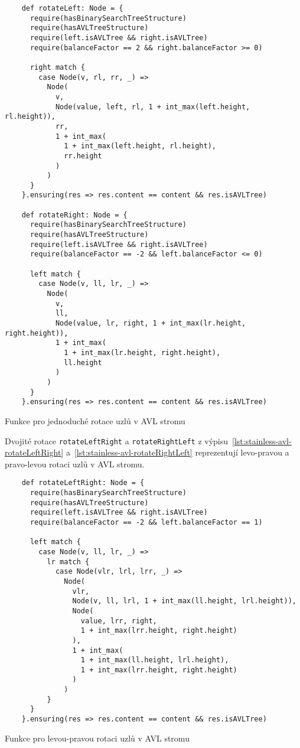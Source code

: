 \begin{listing}[H]
  \begin{verbatim}
    def rotateLeft: Node = {
      require(hasBinarySearchTreeStructure)
      require(hasAVLTreeStructure)
      require(left.isAVLTree && right.isAVLTree)
      require(balanceFactor == 2 && right.balanceFactor >= 0)

      right match {
        case Node(v, rl, rr, _) =>
          Node(
            v,
            Node(value, left, rl, 1 + int_max(left.height, rl.height)),
            rr,
            1 + int_max(
              1 + int_max(left.height, rl.height),
              rr.height
            )
          )
      }
    }.ensuring(res => res.content == content && res.isAVLTree)

    def rotateRight: Node = {
      require(hasBinarySearchTreeStructure)
      require(hasAVLTreeStructure)
      require(left.isAVLTree && right.isAVLTree)
      require(balanceFactor == -2 && left.balanceFactor <= 0)

      left match {
        case Node(v, ll, lr, _) =>
          Node(
            v,
            ll,
            Node(value, lr, right, 1 + int_max(lr.height, right.height)),
            1 + int_max(
              1 + int_max(lr.height, right.height),
              ll.height
            )
          )
      }
    }.ensuring(res => res.content == content && res.isAVLTree)
  \end{verbatim}
  \caption{Funkce pro jednoduché rotace uzlů v AVL stromu}
  \label{lst:stainless-avl-rotate}
\end{listing}

Dvojité rotace \texttt{rotateLeftRight} a \texttt{rotateRightLeft}
z výpisu~\ref{lst:stainless-avl-rotateLeftRight} a~\ref{lst:stainless-avl-rotateRightLeft}
reprezentují levo-pravou a pravo-levou rotaci uzlů v AVL stromu.

\begin{listing}[H]
  \begin{verbatim}
    def rotateLeftRight: Node = {
      require(hasBinarySearchTreeStructure)
      require(hasAVLTreeStructure)
      require(left.isAVLTree && right.isAVLTree)
      require(balanceFactor == -2 && left.balanceFactor == 1)

      left match {
        case Node(v, ll, lr, _) =>
          lr match {
            case Node(vlr, lrl, lrr, _) =>
              Node(
                vlr,
                Node(v, ll, lrl, 1 + int_max(ll.height, lrl.height)),
                Node(
                  value, lrr, right,
                  1 + int_max(lrr.height, right.height)
                ),
                1 + int_max(
                  1 + int_max(ll.height, lrl.height),
                  1 + int_max(lrr.height, right.height)
                )
              )
          }
      }
    }.ensuring(res => res.content == content && res.isAVLTree)
  \end{verbatim}
  \caption{Funkce pro levou-pravou rotaci uzlů v AVL stromu}
  \label{lst:stainless-avl-rotateLeftRight}
\end{listing}

